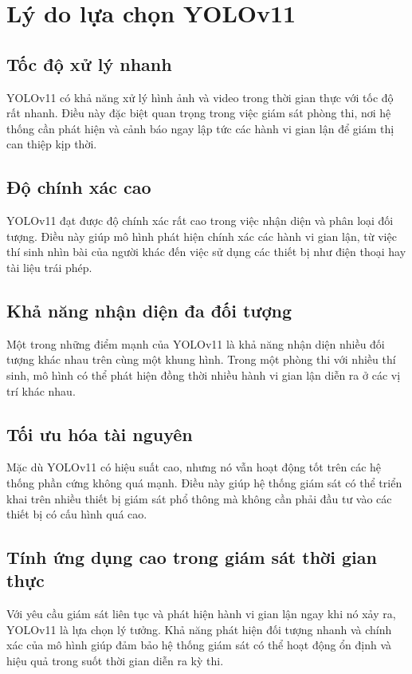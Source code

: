 \documentclass[conference]{IEEEtran}
\begin{document}
\section{Lý do lựa chọn YOLOv11}

\subsection{Tốc độ xử lý nhanh}
YOLOv11 có khả năng xử lý hình ảnh và video trong thời gian thực với tốc độ rất nhanh. Điều này đặc biệt quan trọng trong việc giám sát phòng thi, nơi hệ thống cần phát hiện và cảnh báo ngay lập tức các hành vi gian lận để giám thị can thiệp kịp thời.

\subsection{Độ chính xác cao}
YOLOv11 đạt được độ chính xác rất cao trong việc nhận diện và phân loại đối tượng. Điều này giúp mô hình phát hiện chính xác các hành vi gian lận, từ việc thí sinh nhìn bài của người khác đến việc sử dụng các thiết bị như điện thoại hay tài liệu trái phép.

\subsection{Khả năng nhận diện đa đối tượng}
Một trong những điểm mạnh của YOLOv11 là khả năng nhận diện nhiều đối tượng khác nhau trên cùng một khung hình. Trong một phòng thi với nhiều thí sinh, mô hình có thể phát hiện đồng thời nhiều hành vi gian lận diễn ra ở các vị trí khác nhau.

\subsection{Tối ưu hóa tài nguyên}
Mặc dù YOLOv11 có hiệu suất cao, nhưng nó vẫn hoạt động tốt trên các hệ thống phần cứng không quá mạnh. Điều này giúp hệ thống giám sát có thể triển khai trên nhiều thiết bị giám sát phổ thông mà không cần phải đầu tư vào các thiết bị có cấu hình quá cao.

\subsection{Tính ứng dụng cao trong giám sát thời gian thực}
Với yêu cầu giám sát liên tục và phát hiện hành vi gian lận ngay khi nó xảy ra, YOLOv11 là lựa chọn lý tưởng. Khả năng phát hiện đối tượng nhanh và chính xác của mô hình giúp đảm bảo hệ thống giám sát có thể hoạt động ổn định và hiệu quả trong suốt thời gian diễn ra kỳ thi.
\end{document}
